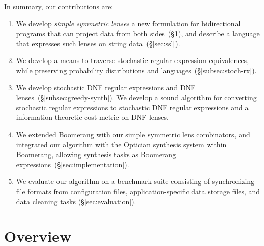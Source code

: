 \documentclass[acmsmall,screen,anonymous]{acmart}
\begin{document}
In summary, our contributions are:
\begin{enumerate}
\item We develop \emph{simple symmetric lenses} a new formulation for
  bidirectional programs that can project data from both sides~(\S\ref{sec:overview}),
  and describe a language that expresses such lenses on string
  data~(\S\ref{sec:ssl}).   
\item We develop a means to traverse stochastic regular expression equivalences,
  while preserving probability distributions and
  languages~(\S\ref{subsec:stoch-rx}).
\item We develop stochastic DNF regular expressions and DNF
  lenses~(\S\ref{subsec:greedy-synth}). We develop a sound algorithm for
  converting stochastic regular expressions to stochastic DNF regular
  expressions and a information-theoretic cost metric on DNF lenses.
\item We extended Boomerang with our simple symmetric lens combinators, and
  integrated our algorithm with the Optician synthesis system within Boomerang,
  allowing synthesis tasks as Boomerang
  expressions~(\S\ref{sec:implementation}).
\item We evaluate our algorithm on a benchmark suite consisting of synchronizing
  file formats from configuration files, application-specific data storage
  files, and data cleaning tasks (\S\ref{sec:evaluation}).  
\end{enumerate}

\section{Overview}
\label{sec:overview}
\end{document}
